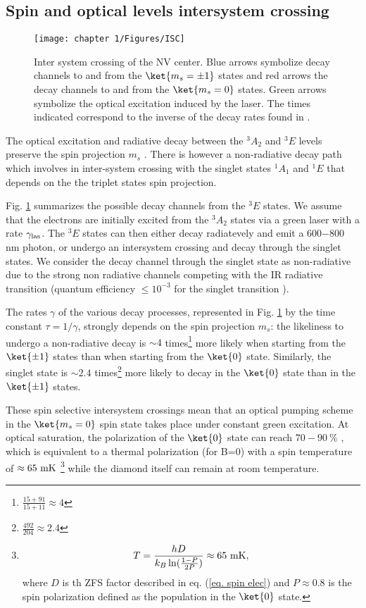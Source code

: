 \documentclass[a4paper, 11pt]{book}
\begin{document}
\subsection{Spin and optical levels intersystem crossing}
\label{sec ISC}
\begin{figure}[h!]
\centering
\texttt{[image: chapter 1/Figures/ISC]}
\caption{Inter system crossing of the NV center. Blue arrows symbolize decay channels to and from the $\ket{m_s=\pm 1}$ states and red arrows the decay channels to and from the $\ket{m_s=0}$ states. Green arrows symbolize the optical excitation induced by the laser. The times indicated correspond to the inverse of the decay rates found in \citep{gupta2016efficient}.}
\label{ISC}
\end{figure}

The optical excitation and radiative decay between the $^3A_2$ and $^3E$ levels preserve the spin projection $m_s$ \citep{robledo2011spin}. There is however a non-radiative decay path which involves in inter-system crossing with the singlet states $^1A_1$ and $^1E$ that depends on the the triplet states spin projection.

Fig. \ref{ISC} summarizes the possible decay channels from the $^3E$ states. We assume that the electrons are initially excited from the $^3A_2$ states via a green laser with a rate $\gamma_{\rm las}$. The $^3E$ states can then either decay radiatevely and emit a 600$-$800 nm photon, or undergo an intersystem crossing and decay through the singlet states. We consider the decay channel through the singlet state as non-radiative due to the strong non radiative channels competing with the IR radiative transition (quantum efficiency $\leq 10^{-3}$ for the singlet transition \citep{rogers2008infrared, ma2010excited, acosta2010optical}).

The rates $\gamma$ of the various decay processes, represented in Fig. \ref{ISC} by the time constant $\tau=1/\gamma$, strongly depends on the spin projection $m_s$: the likeliness to undergo a non-radiative decay is $\sim 4$ times\footnote{$\frac{15+91}{15+11}\approx 4$} more likely when starting from the $\ket{\pm 1}$ states than when starting from the $\ket{0}$ state. Similarly, the singlet state is $\sim 2.4$ times\footnote{$\frac{492}{204} \approx 2.4$} more likely to decay in the $\ket{0}$ state than in the $\ket{\pm 1}$ states.

These spin selective intersystem crossings mean that an optical pumping scheme in the $\ket{m_s=0}$ spin state takes place under constant green excitation. At optical saturation, the polarization of the $\ket{0}$ state can reach $70-90\ \%$ \citep{gupta2016efficient}, which is equivalent to a thermal polarization (for B=0) with a spin temperature of $\approx 65\ \rm mK$ \footnote{\begin{equation*}
T=\frac{h D}{k_B \ln (\frac{1-P}{2P})} \approx 65\ \rm mK,
\end{equation*}
where $D$ is th ZFS factor described in eq. (\ref{eq. spin elec}) and $P\approx 0.8$ is the spin polarization defined as the population in the $\ket{0}$ state.} while the diamond itself can remain at room temperature.
\end{document}
